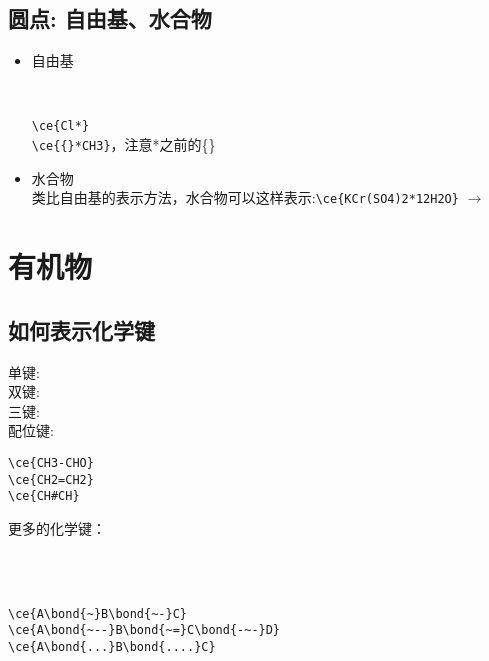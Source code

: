\documentclass[UTF8, a4paper]{article}
\begin{document}
\subsection{圆点: 自由基、水合物}
\begin{itemize}
	\item 自由基\\
	\begin{minipage}{.3\textwidth}
	\\
	\end{minipage}
	\begin{minipage}{.7\textwidth}
	\verb|\ce{Cl*}|\\
	\verb|\ce{{}*CH3}|，注意*之前的\{\}
	\end{minipage}
	\item 水合物\\
	类比自由基的表示方法，水合物可以这样表示:\verb|| $\rightarrow$ \ce{KCr(SO4)2*12H2O}
\end{itemize}

\section{有机物}
\subsection{如何表示化学键}

\begin{minipage}{.3\textwidth}
	单键: \\
	双键: \\
	三键: \\
	配位键: 
\end{minipage}
\begin{minipage}{.7\textwidth}
	\verb|\ce{CH3-CHO}|\\
	\verb|\ce{CH2=CH2}|\\
	\verb|\ce{CH#CH}|\\
\end{minipage}
\newline
更多的化学键：

\begin{minipage}{.3\textwidth} %
	\\
	\\
\end{minipage} %
\begin{minipage}{.7\textwidth} %
	\verb|\ce{A\bond{~}B\bond{~-}C}|\\
	\verb|\ce{A\bond{~--}B\bond{~=}C\bond{-~-}D}|\\
	\verb|\ce{A\bond{...}B\bond{....}C}|
\end{minipage}
\end{document}
